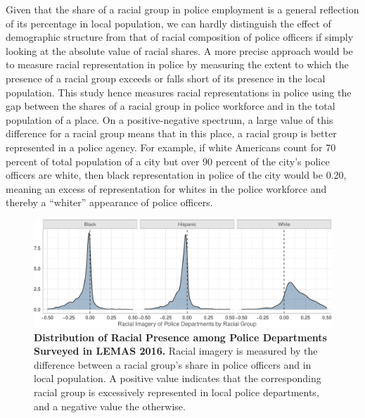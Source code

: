 \documentclass[
  12pt,
]{article}
\begin{document}
Given that the share of a racial group in police employment is a general
reflection of its percentage in local population, we can hardly
distinguish the effect of demographic structure from that of racial
composition of police officers if simply looking at the absolute value
of racial shares. A more precise approach would be to measure racial
representation in police by measuring the extent to which the presence
of a racial group exceeds or falls short of its presence in the local
population. This study hence measures racial representations in police
using the gap between the shares of a racial group in police workforce
and in the total population of a place. On a positive-negative spectrum,
a large value of this difference for a racial group means that in this
place, a racial group is better represented in a police agency. For
example, if white Americans count for 70 percent of total population of
a city but over 90 percent of the city's police officers are white, then
black representation in police of the city would be 0.20, meaning an
excess of representation for whites in the police workforce and thereby
a ``whiter'' appearance of police officers.

\begin{figure}[tb]

{\centering \includegraphics{racialized-police_files/figure-pdf/fig-lemas-density-1.pdf}

}

\caption{\label{fig-lemas-density}\textbf{Distribution of Racial
Presence among Police Departments Surveyed in LEMAS 2016.} Racial
imagery is measured by the difference between a racial group's share in
police officers and in local population. A positive value indicates that
the corresponding racial group is excessively represented in local
police departments, and a negative value the otherwise.}

\end{figure}
\end{document}
